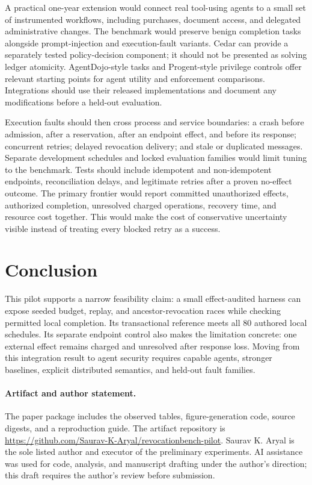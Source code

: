 \documentclass[manuscript,screen,nonacm]{acmart}
\begin{document}
A practical one-year extension would connect real tool-using agents to a small set of instrumented workflows, including purchases, document access, and delegated administrative changes. The benchmark would preserve benign completion tasks alongside prompt-injection and execution-fault variants. Cedar can provide a separately tested policy-decision component; it should not be presented as solving ledger atomicity. AgentDojo-style tasks and Progent-style privilege controls offer relevant starting points for agent utility and enforcement comparisons. Integrations should use their released implementations and document any modifications before a held-out evaluation.

Execution faults should then cross process and service boundaries: a crash before admission, after a reservation, after an endpoint effect, and before its response; concurrent retries; delayed revocation delivery; and stale or duplicated messages. Separate development schedules and locked evaluation families would limit tuning to the benchmark. Tests should include idempotent and non-idempotent endpoints, reconciliation delays, and legitimate retries after a proven no-effect outcome. The primary frontier would report committed unauthorized effects, authorized completion, unresolved charged operations, recovery time, and resource cost together. This would make the cost of conservative uncertainty visible instead of treating every blocked retry as a success.

\section{Conclusion}
This pilot supports a narrow feasibility claim: a small effect-audited harness can expose seeded budget, replay, and ancestor-revocation races while checking permitted local completion. Its transactional reference meets all 80 authored local schedules. Its separate endpoint control also makes the limitation concrete: one external effect remains charged and unresolved after response loss. Moving from this integration result to agent security requires capable agents, stronger baselines, explicit distributed semantics, and held-out fault families.

\paragraph{Artifact and author statement.}
The paper package includes the observed tables, figure-generation code, source digests, and a reproduction guide. The artifact repository is \url{https://github.com/Saurav-K-Aryal/revocationbench-pilot}. Saurav K. Aryal is the sole listed author and executor of the preliminary experiments. AI assistance was used for code, analysis, and manuscript drafting under the author's direction; this draft requires the author's review before submission.



\end{document}
